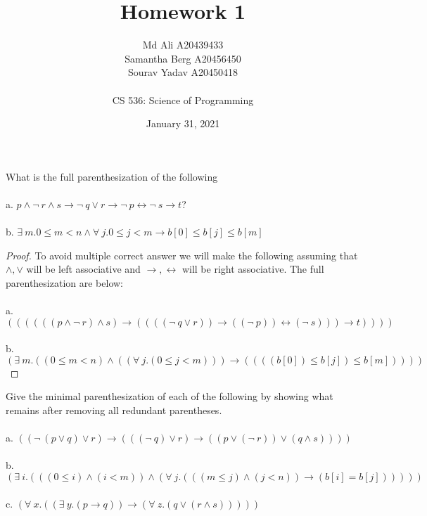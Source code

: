 \documentclass[12pt]{article}
\newenvironment{exercise}[2][Exercise]{\begin{trivlist}
\item[\hskip \labelsep {\bfseries #1}\hskip \labelsep {\bfseries #2.}]}{\end{trivlist}}
\begin{document}
 
\title{Homework 1}
\author{Md Ali A20439433 \\ 
Samantha Berg A20456450 \\ 
Sourav Yadav A20450418 \\ \\
CS 536: Science of Programming} 
\date{January 31, 2021}

\maketitle
 
\begin{exercise}{1}
What is the full parenthesization of the following \\ \\
a. $p \land \neg\: r \land s \rightarrow \neg\: q \lor r \rightarrow \neg\: p \leftrightarrow \neg\: s \rightarrow t$? \\ \\
b. $\exists\: m.0 \leq m < n \land \forall\: j. 0 \leq j < m \rightarrow b[0] \leq b[j] \leq b[m]$ 
\end{exercise} 

\begin{proof}
To avoid multiple correct answer we will make the following assuming that $\land, \lor$ will be left associative and $\rightarrow, \leftrightarrow$ will be right associative. The full parenthesization are below:\\ \\ 
a. $((((((p \land \neg\: r) \land s) \rightarrow ((((\neg\: q \lor r)) \rightarrow ((\neg\: p)) \leftrightarrow (\neg\: s))) \rightarrow t))))$ \\ \\
b. $(\exists\: m.((0 \leq m < n) \land ((\forall\: j.(0 \leq j < m))) \rightarrow ((((b[0]) \leq b[j]) \leq b[m]))))$ 

\end{proof}

\begin{exercise}{2}
Give the minimal parenthesization of each of the following by showing what remains after removing all redundant parentheses. \\ \\
a. $(( \neg\: (p \lor q) \lor r) \rightarrow ((( \neg\: q) \lor r) \rightarrow ((p \lor (\neg\: r)) \lor (q \land s))))$\\ \\ 
b. $(\exists\: i.(((0 \leq i) \land (i < m)) \land (\forall\: j. (((m \leq j) \land (j < n)) \rightarrow (b[i] = b[j])))))$\\ \\
c. $(\forall\: x.(( \exists\: y.(p \rightarrow q)) \rightarrow (\forall\: z.(q \lor (r \land s)))))$
\end{exercise}
 
\end{document}

